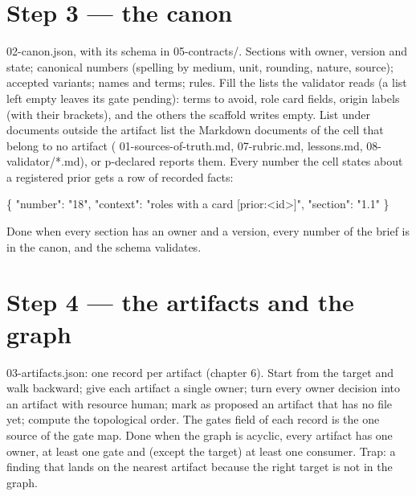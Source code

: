 \documentclass[
  american,
  10pt,
]{report}
\newenvironment{Shaded}{\begin{snugshade}}{\end{snugshade}}
\newcommand{\NormalTok}[1]{#1}
\renewenvironment{Shaded}{%
  \def\FrameCommand{{\color{rulecolor}\vrule width 2pt}\hspace{6pt}\colorbox{shadecolor}}%
  \MakeFramed{\advance\hsize-\width\FrameRestore}\small}%
  {\endMakeFramed}
\renewcommand{\texttt}[1]{{\ttfamily\hyphenchar\font=-1 #1}}
\begin{document}
\section{Step 3 --- the canon}\label{step-3-the-canon}

\texttt{02-\allowbreak{}canon.\allowbreak{}json}, with its schema in
\texttt{05-\allowbreak{}contracts/\allowbreak{}}. Sections with owner,
version and state; canonical numbers (spelling by medium, unit,
rounding, nature, source); accepted variants; names and terms; rules.
Fill the lists the validator reads (a list left empty leaves its gate
pending): \texttt{terms to avoid}, \texttt{role card fields},
\texttt{origin labels} (with their brackets), and the others the
scaffold writes empty. List under
\texttt{documents outside the artifact list} the Markdown documents of
the cell that belong to no artifact
(\texttt{01-\allowbreak{}sources-\allowbreak{}of-\allowbreak{}truth.\allowbreak{}md},
\texttt{07-\allowbreak{}rubric.\allowbreak{}md},
\texttt{lessons.\allowbreak{}md},
\texttt{08-\allowbreak{}validator/\allowbreak{}*.\allowbreak{}md}), or
\texttt{p-\allowbreak{}declared} reports them. Every number the cell
states about a registered prior gets a row of \texttt{recorded facts}:

\begin{Shaded}
\begin{Highlighting}[]
\NormalTok{\{ "number": "18", "context": "roles with a card [prior:\textless{}id\textgreater{}]", "section": "1.1" \}}
\end{Highlighting}
\end{Shaded}

Done when every section has an owner and a version, every number of the
brief is in the canon, and the schema validates.

\section{Step 4 --- the artifacts and the
graph}\label{step-4-the-artifacts-and-the-graph}

\texttt{03-\allowbreak{}artifacts.\allowbreak{}json}: one record per
artifact (chapter 6). Start from the target and walk backward; give each
artifact a single owner; turn every owner decision into an artifact with
resource \texttt{human}; mark as \texttt{proposed} an artifact that has
no file yet; compute the topological order. The \texttt{gates} field of
each record is the one source of the gate map. Done when the graph is
acyclic, every artifact has one owner, at least one gate and (except the
target) at least one consumer. Trap: a finding that lands on the nearest
artifact because the right target is not in the graph.
\end{document}
